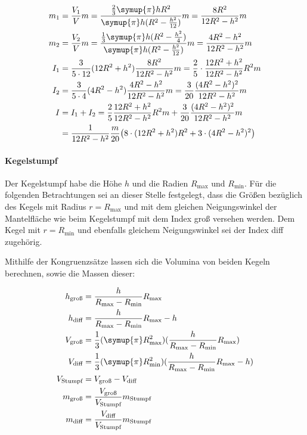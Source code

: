 \begin{align}
    m_1&=\frac{V_1}{V}m=\frac{\frac{2}{3}\symup{\pi}hR^2}{\symup{\pi}h(R^2-\frac{h^2}{12})}m=\frac{8R^2}{12R^2-h^2}m \\
    m_2&=\frac{V_2}{V}m=\frac{\frac{1}{3}\symup{\pi}h(R^2-\frac{h^2}{4})}{\symup{\pi}h(R^2-\frac{h^2}{12})}m=\frac{4R^2-h^2}{12R^2-h^2}m \\
    I_1&=\frac{3}{5\cdot12}(12R^2+h^2)\frac{8R^2}{12R^2-h^2}m=\frac{2}{5}\cdot \frac{12R^2+h^2}{12R^2-h^2}R^2m \\
    I_2&=\frac{3}{5\cdot4}(4R^2-h^2)\frac{4R^2-h^2}{12R^2-h^2}m=\frac{3}{20}\frac{(4R^2-h^2)^2}{12R^2-h^2}m \\
    I&=I_1+I_2=\frac{2}{5}\frac{12R^2+h^2}{12R^2-h^2}R^2m+\frac{3}{20}\frac{(4R^2-h^2)^2}{12R^2-h^2}m \\
        &= \frac{1}{12R^2-h^2}\frac{m}{20}\bigl(8\cdot(12R^2+h^2)R^2+3\cdot(4R^2-h^2)^2\bigr) 
\end{align}

\paragraph{Kegelstumpf}

Der Kegelstumpf habe die Höhe $h$ und die Radien $R_\text{max}$ und $R_\text{min}$. 
Für die folgenden Betrachtungen sei an dieser Stelle festgelegt, dass die Größen bezüglich des Kegels mit Radius ${r=R_\text{max}}$
und mit dem gleichen Neigungswinkel der Mantelfläche wie beim Kegelstumpf mit dem Index \glqq groß\grqq{} versehen werden. 
Dem Kegel mit ${r=R_\text{min}}$ und ebenfalls gleichem Neigungswinkel sei der Index \glqq diff\grqq{} zugehörig. 

Mithilfe der Kongruenzsätze lassen sich die Volumina von beiden Kegeln berechnen, sowie die Massen dieser:

\begin{align}
    h_\text{groß}&= \frac{h}{R_\text{max}-R_\text{min}} R_\text{max} \\
    h_\text{diff}&= \frac{h}{R_\text{max}-R_\text{min}} R_\text{max}-h \\
    V_\text{groß}&= \frac{1}{3} (\symup{\pi} R_\text{max}^2) (\frac{h}{R_\text{max}-R_\text{min}} R_\text{max}) \\
    V_\text{diff}&= \frac{1}{3} (\symup{\pi} R_\text{min}^2) (\frac{h}{R_\text{max}-R_\text{min}} R_\text{max}-h) \\
    V_\text{Stumpf}&= V_\text{groß}-V_\text{diff} \\
    m_\text{groß}&= \frac{V_\text{groß}}{V_\text{Stumpf}}m_\text{Stumpf} \\
    m_\text{diff}&= \frac{V_\text{diff}}{V_\text{Stumpf}}m_\text{Stumpf}
\end{align}

